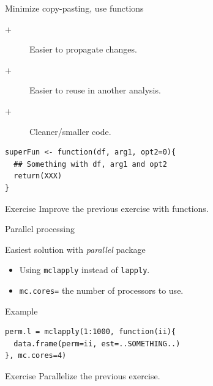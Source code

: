 \documentclass[10pt]{beamer}
\begin{document}
\begin{frame}[fragile]{Minimize copy-pasting, use {\sf functions}}
  \begin{block}{}
    \begin{description}
    \item[+] Easier to propagate changes.
    \item[+] Easier to reuse in another analysis.
    \item[+] Cleaner/smaller code.
    \end{description}
  \end{block}
  \begin{block}{}
  \begin{lstlisting}
superFun <- function(df, arg1, opt2=0){
  ## Something with df, arg1 and opt2
  return(XXX)
}
  \end{lstlisting}
  \end{block}
  \begin{alertblock}{Exercise}
    Improve the previous exercise with {\sf functions}.
  \end{alertblock}
\end{frame}

\begin{frame}[fragile]{Parallel processing}
  \begin{block}{Easiest solution with {\it parallel} package}
    \begin{itemize}
    \item Using \verb!mclapply! instead of \verb!lapply!.
    \item \verb!mc.cores=! the number of processors to use.
    \end{itemize}
  \end{block}
  \begin{exampleblock}{Example}
\begin{lstlisting}
perm.l = mclapply(1:1000, function(ii){
  data.frame(perm=ii, est=..SOMETHING..)
}, mc.cores=4)
\end{lstlisting}
  \end{exampleblock}
  \begin{alertblock}{Exercise}
    Parallelize the previous exercise.
  \end{alertblock}
\end{frame}
\end{document}
